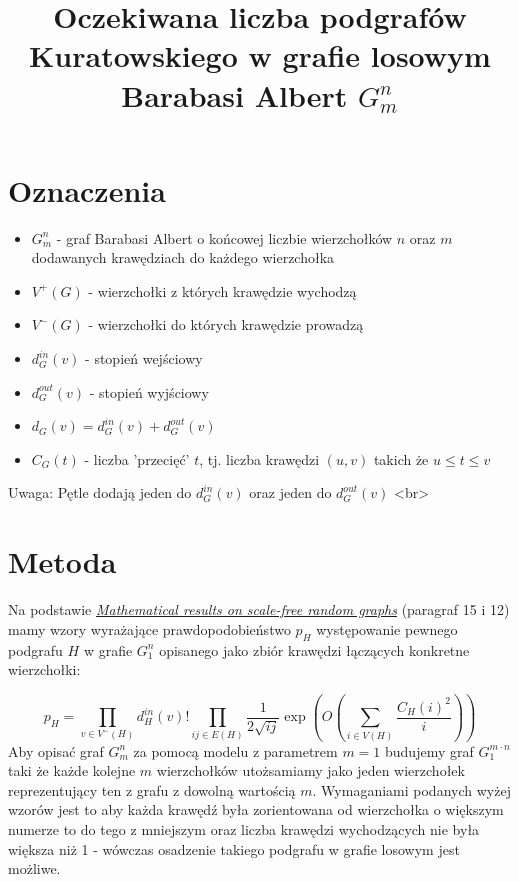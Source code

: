 \documentclass{article}
\title{ Oczekiwana liczba podgrafów Kuratowskiego \newline w grafie losowym Barabasi Albert $G^n_m$ }
\author{}
\date{}
\begin{document}
\maketitle

\section{Oznaczenia}
\begin{itemize}
  \item $G_{m}^{n}$ - graf Barabasi Albert o końcowej liczbie wierzchołków $n$ oraz $m$ dodawanych krawędziach do każdego wierzchołka
  \item $V^{+}(G)$ - wierzchołki z których krawędzie wychodzą
  \item $V^{-}(G)$ - wierzchołki do których krawędzie prowadzą
  \item $d_{G}^{in}(v)$ - stopień wejściowy
  \item $d_{G}^{out}(v)$ - stopień wyjściowy
  \item $d_{G}(v) = d_{G}^{in}(v) + d_{G}^{out}(v)$
  \item $C_{G}(t)$ - liczba 'przecięć' $t$, tj. liczba krawędzi $(u,v)$ takich że $u \leq t \leq v$
\end{itemize}

Uwaga: Pętle dodają jeden do $d_{G}^{in}(v)$ oraz jeden do $d_{G}^{out}(v)$ <br>

\section{Metoda}
Na podstawie \href{https://www.stat.berkeley.edu/users/aldous/Networks/boll1.pdf}
{\textit{Mathematical results on scale-free random graphs}} (paragraf 15 i 12)
mamy wzory wyrażające prawdopodobieństwo $p_H$ występowanie pewnego podgrafu $H$ w grafie $G^n_1$ 
opisanego jako zbiór krawędzi łączących konkretne wierzchołki:

\begin{dmath}
  p_H = \prod_{v \in V^{-}(H)} d_{H}^{in}(v)! \prod_{ij \in E(H)} \frac{1}{2 \sqrt{ij}} \exp(O(\sum_{i \in V(H)}\frac{C_H(i)^2}{i}))
\end{dmath}
Aby opisać graf $G^n_m$ za pomocą modelu z parametrem $m=1$ budujemy graf $G^{m \cdot n}_1$
taki że każde kolejne $m$ wierzchołków utożsamiamy jako jeden wierzchołek reprezentujący ten z grafu z dowolną wartością $m$.
\newline
Wymaganiami podanych wyżej wzorów jest to aby każda krawędź była zorientowana od wierzchołka o większym numerze to do tego z mniejszym
oraz liczba krawędzi wychodzących nie była większa niż 1 - wówczas osadzenie takiego podgrafu w grafie losowym jest możliwe.
\end{document}
